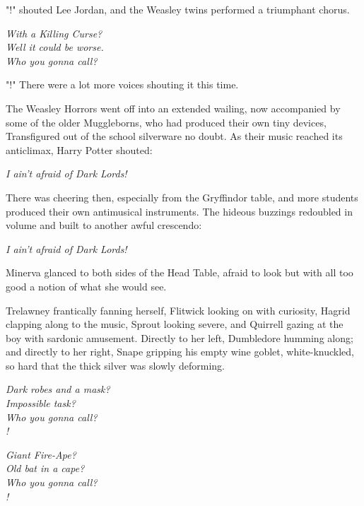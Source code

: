 "!" shouted Lee Jordan, and the Weasley twins performed a 
triumphant chorus.

\begin{center}
\emph{With a Killing Curse?\\
Well it could be worse.\\
Who you gonna call?}
\end{center}

"!" There were a lot more voices shouting it this time.

The Weasley Horrors went off into an extended wailing, now accompanied by some 
of the older Muggleborns, who had produced their own tiny devices, Transfigured 
out of the school silverware no doubt. As their music reached its anticlimax, 
Harry Potter shouted:

\begin{center}
\emph{I ain't afraid of Dark Lords!}
\end{center}

There was cheering then, especially from the Gryffindor table, and more 
students produced their own antimusical instruments. The hideous buzzings 
redoubled in volume and built to another awful crescendo:

\begin{center}
\emph{I ain't afraid of Dark Lords!}
\end{center}

Minerva glanced to both sides of the Head Table, afraid to look but with all 
too good a notion of what she would see.

Trelawney frantically fanning herself, Flitwick looking on with curiosity, 
Hagrid clapping along to the music, Sprout looking severe, and Quirrell gazing 
at the boy with sardonic amusement. Directly to her left, Dumbledore humming 
along; and directly to her right, Snape gripping his empty wine goblet, 
white-knuckled, so hard that the thick silver was slowly deforming.

\begin{center}
\emph{Dark robes and a mask?\\
Impossible task?\\
Who you gonna call?\\
!}

\emph{Giant Fire-Ape?\\
Old bat in a cape?\\
Who you gonna call?\\
!}
\end{center}

